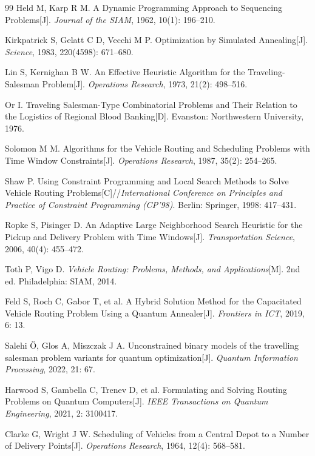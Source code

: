 \documentclass[UTF8,12pt,a4paper]{ctexart}
\begin{document}
\begin{thebibliography}{99}
Held M, Karp R M. A Dynamic Programming Approach to Sequencing Problems[J]. \emph{Journal of the SIAM}, 1962, 10(1): 196--210.

Kirkpatrick S, Gelatt C D, Vecchi M P. Optimization by Simulated Annealing[J]. \emph{Science}, 1983, 220(4598): 671--680.

Lin S, Kernighan B W. An Effective Heuristic Algorithm for the Traveling-Salesman Problem[J]. \emph{Operations Research}, 1973, 21(2): 498--516.

Or I. Traveling Salesman-Type Combinatorial Problems and Their Relation to the Logistics of Regional Blood Banking[D]. Evanston: Northwestern University, 1976.

Solomon M M. Algorithms for the Vehicle Routing and Scheduling Problems with Time Window Constraints[J]. \emph{Operations Research}, 1987, 35(2): 254--265.

Shaw P. Using Constraint Programming and Local Search Methods to Solve Vehicle Routing Problems[C]//\emph{International Conference on Principles and Practice of Constraint Programming (CP'98)}. Berlin: Springer, 1998: 417--431.

Ropke S, Pisinger D. An Adaptive Large Neighborhood Search Heuristic for the Pickup and Delivery Problem with Time Windows[J]. \emph{Transportation Science}, 2006, 40(4): 455--472.

Toth P, Vigo D. \emph{Vehicle Routing: Problems, Methods, and Applications}[M]. 2nd ed. Philadelphia: SIAM, 2014.

Feld S, Roch C, Gabor T, et al. A Hybrid Solution Method for the Capacitated Vehicle Routing Problem Using a Quantum Annealer[J]. \emph{Frontiers in ICT}, 2019, 6: 13.

Salehi Ö, Glos A, Miszczak J A. Unconstrained binary models of the travelling salesman problem variants for quantum optimization[J]. \emph{Quantum Information Processing}, 2022, 21: 67.

Harwood S, Gambella C, Trenev D, et al. Formulating and Solving Routing Problems on Quantum Computers[J]. \emph{IEEE Transactions on Quantum Engineering}, 2021, 2: 3100417.

Clarke G, Wright J W. Scheduling of Vehicles from a Central Depot to a Number of Delivery Points[J]. \emph{Operations Research}, 1964, 12(4): 568--581.

\end{thebibliography}
\end{document}
